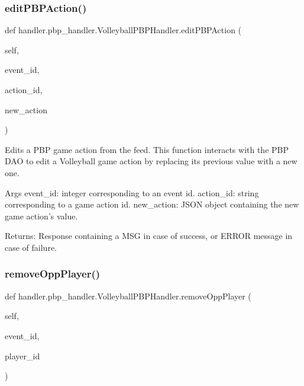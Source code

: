 \subsubsection{\texorpdfstring{edit\+P\+B\+P\+Action()}{editPBPAction()}}
{\footnotesize\ttfamily def handler.\+pbp\+\_\+handler.\+Volleyball\+P\+B\+P\+Handler.\+edit\+P\+B\+P\+Action (\begin{DoxyParamCaption}\item[{}]{self,  }\item[{}]{event\+\_\+id,  }\item[{}]{action\+\_\+id,  }\item[{}]{new\+\_\+action }\end{DoxyParamCaption})}

\begin{DoxyVerb}Edits a PBP game action from the feed.
This function interacts with the PBP DAO to edit a Volleyball game action
by replacing its previous value with a new one.

Args
    event_id: integer corresponding to an event id.
    action_id: string corresponding to a game action id.
    new_action: JSON object containing the new game action's value.

Returns:
    Response containing a MSG in case of success, or ERROR message in case of failure.
\end{DoxyVerb}
 \mbox{\label{classhandler_1_1pbp__handler_1_1_volleyball_p_b_p_handler_a62bd2008499c4b5f504dddc884ca01b2}} 
\subsubsection{\texorpdfstring{remove\+Opp\+Player()}{removeOppPlayer()}}
{\footnotesize\ttfamily def handler.\+pbp\+\_\+handler.\+Volleyball\+P\+B\+P\+Handler.\+remove\+Opp\+Player (\begin{DoxyParamCaption}\item[{}]{self,  }\item[{}]{event\+\_\+id,  }\item[{}]{player\+\_\+id }\end{DoxyParamCaption})}

